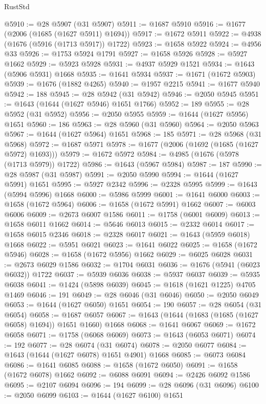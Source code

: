 \begin{lexlean}{RustStd}
\begin{coremodule}
@5910 := @28 @5907 (@31 @5907)
@5911 := @1687 @5910
@5916 := @1677 (@2006 (@1685 (@1627 @5911) @1694))
@5917 := @1672 @5911
@5922 := @4938 (@1676 (@5916 (@1713 @5917)) @1722)
@5923 := @1658 @5922
@5924 := @4956 @33
@5926 := @1753 @5924 @1791
@5927 := @1658 @5926
@5928 := @5927 @1662
@5929 := @5923 @5928
@5931 := @4937 @5929 @1521
@5934 := @1643 (@5906 @5931) @1668
@5935 := @1641 @5934
@5937 := @1671 (@1672 @5903)
@5939 := @1676 (@1882 @4265)
@5940 := @1957 @2215
@5941 := @1677 @5940
@5942 := 188
@5945 := @28 @5942 (@31 @5942)
@5946 := @2050 @5945
@5951 := @1643 (@1644 (@1627 @5946) @1651 @1766)
@5952 := 189
@5955 := @28 @5952 (@31 @5952)
@5956 := @2050 @5955
@5959 := @1644 (@1627 @5956) @1651
@5960 := 186
@5963 := @28 @5960 (@31 @5960)
@5964 := @2050 @5963
@5967 := @1644 (@1627 @5964) @1651
@5968 := 185
@5971 := @28 @5968 (@31 @5968)
@5972 := @1687 @5971
@5978 := @1677 (@2006 (@1692 (@1685 (@1627 @5972) @1693)))
@5979 := @1672 @5972
@5984 := @4985 (@1676 (@5978 (@1713 @5979)) @1722)
@5986 := @1643 (@5967 @5984)
@5987 := 187
@5990 := @28 @5987 (@31 @5987)
@5991 := @2050 @5990
@5994 := @1644 (@1627 @5991) @1651
@5995 := @5927 @2342
@5996 := @2328 @5995
@5999 := @1643 (@5994 @5996) @1668
@6000 := @5986 @5999
@6001 := @1641 @6000
@6003 := @1658 (@1672 @5964)
@6006 := @1658 (@1672 @5991) @1662
@6007 := @6003 @6006
@6009 := @2673 @6007 @1586
@6011 := @1758 (@6001 @6009)
@6013 := @1658 @6011 @1662
@6014 := @5646 @6013
@6015 := @2332 @6014
@6017 := @1658 @6015 @2346
@6018 := @2328 @6017
@6021 := @1643 (@5959 @6018) @1668
@6022 := @5951 @6021
@6023 := @1641 @6022
@6025 := @1658 (@1672 @5946)
@6028 := @1658 (@1672 @5956) @1662
@6029 := @6025 @6028
@6031 := @2673 @6029 @1586
@6032 := @1704 @6031
@6036 := @1676 (@5941 (@6023 @6032)) @1722
@6037 := @5939 @6036
@6038 := @5937 @6037
@6039 := @5935 @6038
@6041 := @1424 (@5898 @6039)
@6045 := @1618 (@1621 @1225) @4705 @1469
@6046 := 191
@6049 := @28 @6046 (@31 @6046)
@6050 := @2050 @6049
@6053 := @1644 (@1627 @6050) @1651
@6054 := 190
@6057 := @28 @6054 (@31 @6054)
@6058 := @1687 @6057
@6067 := @1643 (@1644 (@1683 (@1685 (@1627 @6058) @1694)) @1651 @1660) @1668
@6068 := @1641 @6067
@6069 := @1672 @6058
@6071 := @1758 (@6068 @6069)
@6073 := @1643 (@6053 @6071)
@6074 := 192
@6077 := @28 @6074 (@31 @6074)
@6078 := @2050 @6077
@6084 := @1643 (@1644 (@1627 @6078) @1651 @4901) @1668
@6085 := @6073 @6084
@6086 := @1641 @6085
@6088 := @1658 (@1672 @6050)
@6091 := @1658 (@1672 @6078) @1662
@6092 := @6088 @6091
@6094 := @2426 @6092 @1586
@6095 := @2107 @6094
@6096 := 194
@6099 := @28 @6096 (@31 @6096)
@6100 := @2050 @6099
@6103 := @1644 (@1627 @6100) @1651

\end{coremodule}
\end{lexlean}
